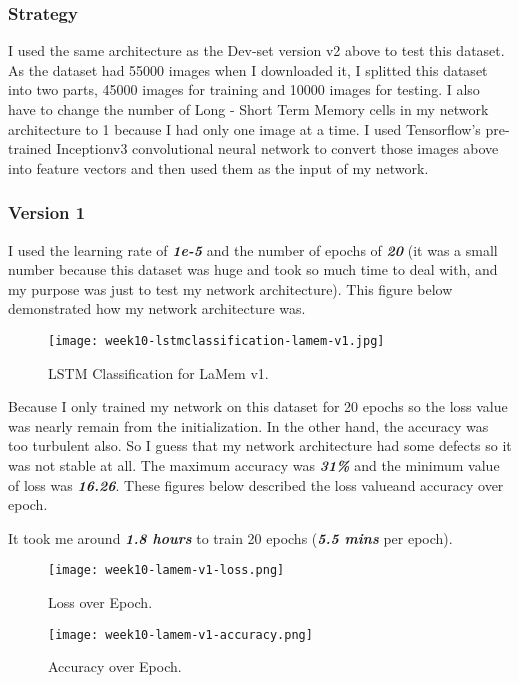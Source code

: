 \subsubsection{Strategy}
I used the same architecture as the Dev-set version v2 above to test this dataset. As the dataset had 55000 images when I downloaded it, I splitted this dataset into two parts, 45000 images for training and 10000 images for testing. I also have to change the number of Long - Short Term Memory cells in my network architecture to 1 because I had only one image at a time. I used Tensorflow's pre-trained Inceptionv3 convolutional neural network to convert those images above into feature vectors and then used them as the input of my network. 

\subsubsection{Version 1}
I used the learning rate of \textbf{\emph{1e-5}} and the number of epochs of \textbf{\emph{20}} (it was a small number because this dataset was huge and took so much time to deal with, and my purpose was just to test my network architecture). This figure below demonstrated how my network architecture was.

\begin{figure}[!ht]
\centering
\texttt{[image: week10-lstmclassification-lamem-v1.jpg]}
\caption{LSTM Classification for LaMem v1.}
\end{figure}

Because I only trained my network on this dataset for 20 epochs so the loss value was nearly remain from the initialization. In the other hand, the accuracy was too turbulent also. So I guess that my network architecture had some defects so it was not stable at all. The maximum accuracy was \textbf{\emph{31\%}} and the minimum value of loss was \textbf{\emph{16.26}}. These figures below described the loss valueand accuracy over epoch.

It took me around \textbf{\emph{1.8 hours}} to train 20 epochs (\textbf{\emph{5.5 mins}} per epoch).

\begin{figure}[!ht]
\centering
\texttt{[image: week10-lamem-v1-loss.png]}
\caption{Loss over Epoch.}
\end{figure}

\begin{figure}[!ht]
\centering
\texttt{[image: week10-lamem-v1-accuracy.png]}
\caption{Accuracy over Epoch.}
\end{figure}